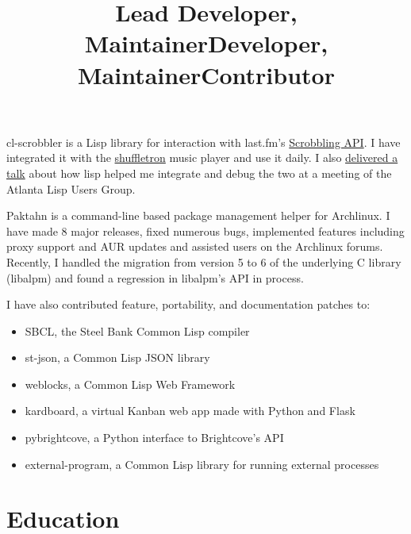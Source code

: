 \documentclass[margintitle,line]{res}
\begin{document}
\begin{resume}
\title{Lead Developer, Maintainer}
\begin{position}
  cl-scrobbler is a Lisp library for interaction with last.fm's
  \href{http://www.last.fm/api/scrobbling}{Scrobbling API}. I have integrated
  it with the \href{http://vintage-digital.com/hefner/software/shuffletron/}{shuffletron}
  music player and use it daily. I also
  \href{http://redlinernotes.com/docs/talks/cl-mft.html}{delivered a talk}
  about how lisp helped me integrate and debug the two at a meeting of the
  Atlanta Lisp Users Group.
\end{position}

\title{Developer, Maintainer}
\begin{position}
  Paktahn is a command-line based package management helper for Archlinux.
  I have made 8 major releases, fixed numerous bugs, implemented features
  including proxy support and AUR updates and assisted users on the Archlinux
  forums. Recently, I handled the migration from version 5 to 6 of the
  underlying C library (libalpm) and found a regression in libalpm's API in
  process.
\end{position}

\title{Contributor}
\begin{position}
  I have also contributed feature, portability, and documentation patches to:
  \begin{itemize}
    \item{SBCL, the Steel Bank Common Lisp compiler}
    \item{st-json, a Common Lisp JSON library}
    \item{weblocks, a Common Lisp Web Framework}
    \item{kardboard, a virtual Kanban web app made with Python and Flask}
    \item{pybrightcove, a Python interface to Brightcove's API}
    \item{external-program, a Common Lisp library for running external processes}
  \end{itemize}
\end{position}


\section{Education}


\end{resume}
\end{document}
